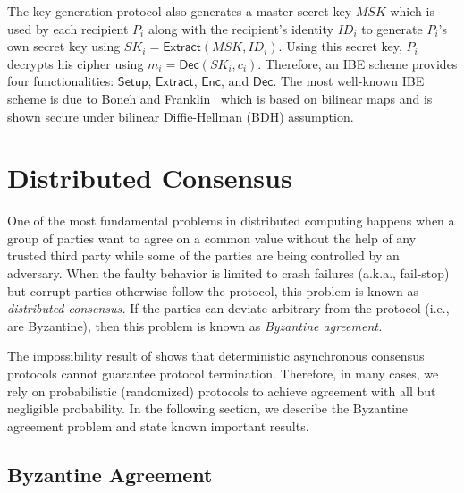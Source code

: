 \documentclass[10pt]{article}
\theoremstyle{plain}
\begin{document}
The key generation protocol also generates a master secret key $MSK$
which is used by each recipient $P_{i}$ along with the recipient's
identity $ID_{i}$ to generate $P_{i}$'s own secret key using $SK_{i}=\mathsf{Extract}(MSK,ID_{i})$.
Using this secret key, $P_{i}$ decrypts his cipher using $m_{i}=\mathsf{Dec}(SK_{i},c_{i})$.
Therefore, an IBE scheme provides four functionalities: $\mathsf{Setup}$,
$\mathsf{Extract}$, $\mathsf{Enc}$, and $\mathsf{Dec}$. The most
well-known IBE scheme is due to Boneh and Franklin~\cite{Boneh2001ibe}
which is based on bilinear maps and is shown secure under bilinear
Diffie-Hellman (BDH) assumption.

\section{Distributed Consensus}

One of the most fundamental problems in distributed computing happens
when a group of parties want to agree on a common value without the
help of any trusted third party while some of the parties are being
controlled by an adversary. When the faulty behavior is limited to
crash failures (a.k.a., fail-stop) but corrupt parties otherwise follow
the protocol, this problem is known as\emph{ distributed consensus.
}If the parties can deviate arbitrary from the protocol (i.e., are
Byzantine), then this problem is known as \emph{Byzantine agreement.}

The impossibility result of \cite{FLP} shows that deterministic asynchronous
consensus protocols cannot guarantee protocol termination. Therefore,
in many cases, we rely on probabilistic (randomized) protocols to
achieve agreement with all but negligible probability. In the following
section, we describe the Byzantine agreement problem and state known
important results.

\subsection{Byzantine Agreement}
\end{document}
